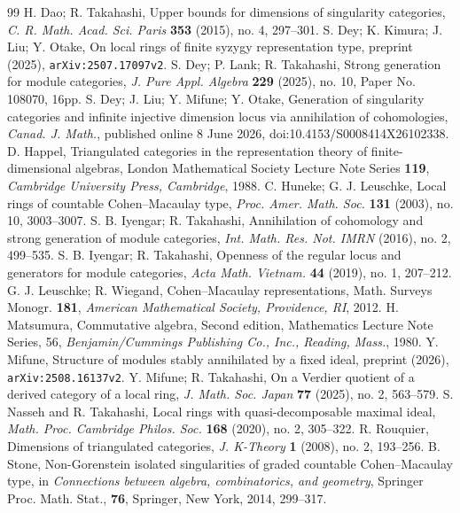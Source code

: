 \documentclass[10pt]{amsart}
\theoremstyle{definition}
\theoremstyle{remark}
\numberwithin{equation}{thm}
\begin{document}
\begin{thebibliography}{99}
{\sc H. Dao; R. Takahashi}, Upper bounds for dimensions of singularity categories, {\em C. R. Math. Acad. Sci. Paris} {\bf 353} (2015), no. 4, 297--301.
{\sc S. Dey; K. Kimura; J. Liu; Y. Otake}, On local rings of finite syzygy representation type, preprint (2025), {\tt arXiv:2507.17097v2}.
{\sc S. Dey; P. Lank; R. Takahashi}, Strong generation for module categories, {\em J. Pure Appl. Algebra} {\bf 229} (2025), no. 10, Paper No. 108070, 16pp.
{\sc S. Dey; J. Liu; Y. Mifune; Y. Otake}, Generation of singularity categories and infinite injective dimension locus via annihilation of cohomologies, {\em Canad. J. Math.}, published online 8 June 2026, doi:10.4153/S0008414X26102338.
{\sc D. Happel}, Triangulated categories in the representation theory of finite-dimensional algebras, London Mathematical Society Lecture Note Series {\bf 119}, {\it Cambridge University Press, Cambridge}, 1988.
{\sc C. Huneke; G. J. Leuschke}, Local rings of countable Cohen--Macaulay type, {\em Proc. Amer. Math. Soc.} {\bf 131} (2003), no. 10, 3003--3007.
{\sc S. B. Iyengar; R. Takahashi}, Annihilation of cohomology and strong generation of module categories, {\em Int. Math. Res. Not. IMRN} (2016), no. 2, 499--535.
{\sc S. B. Iyengar; R. Takahashi}, Openness of the regular locus and generators for module categories, {\em Acta Math. Vietnam.} {\bf 44} (2019), no. 1, 207--212.
{\sc G. J. Leuschke; R. Wiegand}, Cohen--Macaulay representations, Math. Surveys Monogr. {\bf 181}, {\em American Mathematical Society, Providence, RI}, 2012.
{\sc H. Matsumura}, Commutative algebra, Second edition, Mathematics Lecture Note Series, 56, {\em Benjamin/Cummings
Publishing Co., Inc., Reading, Mass.}, 1980.
{\sc Y. Mifune}, Structure of modules stably annihilated by a fixed ideal, preprint (2026), {\tt arXiv:2508.16137v2}.
{\sc Y. Mifune; R. Takahashi}, On a Verdier quotient of a derived category of a local ring,
{\em J. Math. Soc. Japan} {\bf 77} (2025), no. 2, 563--579.
{\sc S. Nasseh and R. Takahashi}, Local rings with quasi-decomposable maximal ideal, {\em Math. Proc. Cambridge Philos. Soc.} {\bf 168} (2020), no. 2, 305--322.
{\sc R. Rouquier}, Dimensions of triangulated categories, {\em J. K-Theory} {\bf 1} (2008), no. 2, 193--256.
{\sc B. Stone}, Non-Gorenstein isolated singularities of graded countable Cohen--Macaulay type, in {\em Connections between algebra, combinatorics, and geometry}, Springer Proc. Math. Stat., {\bf 76}, Springer, New York, 2014, 299--317.

\end{thebibliography}
\end{document}
